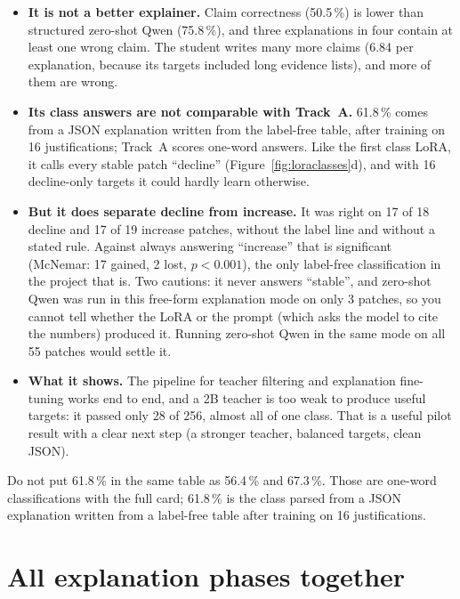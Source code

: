 \begin{itemize}
  \item \textbf{It is not a better explainer.} Claim correctness (50.5\,\%) is lower than structured zero-shot Qwen (75.8\,\%), and three explanations in four contain at least one wrong claim. The student writes many more claims (6.84 per explanation, because its targets included long evidence lists), and more of them are wrong.
  \item \textbf{Its class answers are not comparable with Track~A.} 61.8\,\% comes from a JSON explanation written from the label-free table, after training on 16 justifications; Track~A scores one-word answers. Like the first class LoRA, it calls every stable patch ``decline'' (Figure~\ref{fig:loraclasses}d), and with 16 decline-only targets it could hardly learn otherwise.
  \item \textbf{But it does separate decline from increase.} It was right on 17 of 18 decline and 17 of 19 increase patches, without the label line and without a stated rule. Against always answering ``increase'' that is significant (McNemar: 17 gained, 2 lost, $p < 0.001$), the only label-free classification in the project that is. Two cautions: it never answers ``stable'', and zero-shot Qwen was run in this free-form explanation mode on only 3 patches, so you cannot tell whether the LoRA or the prompt (which asks the model to cite the numbers) produced it. Running zero-shot Qwen in the same mode on all 55 patches would settle it.
  \item \textbf{What it shows.} The pipeline for teacher filtering and explanation fine-tuning works end to end, and a 2B teacher is too weak to produce useful targets: it passed only 28 of 256, almost all of one class. That is a useful pilot result with a clear next step (a stronger teacher, balanced targets, clean JSON).
\end{itemize}

\begin{watchout}
Do not put 61.8\,\% in the same table as 56.4\,\% and 67.3\,\%. Those are one-word classifications with the full card; 61.8\,\% is the class parsed from a JSON explanation written from a label-free table after training on 16 justifications.
\end{watchout}

\section{All explanation phases together}

